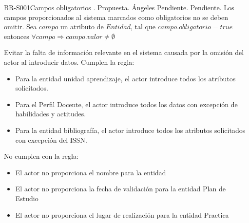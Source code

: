 \begin{BusinessRule}{BR-S001}{Campos obligatorios}
	{\bcIntegridad}    %
	{\btEnabler}     %
	{\blControlling}    %
	.
	\BRItem[Estado] Propuesta.
	 Ángeles
	 Pendiente.
	 Pendiente.
	\BRItem[Descripción] Los campos proporcionados al sistema marcados como obligatorios no se deben omitir.
	\BRItem[Sentencia] Sea $campo$ un atributo de $Entidad$, tal que $campo.obligatorio = true$ entonces
	$ \forall campo \Rightarrow campo.valor \neq \emptyset $
	
	\BRItem[Motivación] Evitar la falta de información relevante en el sistema causada por la omisión del actor al introducir datos.
	 Cumplen la regla:
	\begin{itemize}
		\item Para la entidad unidad aprendizaje, el actor introduce todos los atributos solicitados.
		\item Para el Perfil Docente, el actor introduce todos los datos con excepción de habilidades y actitudes.
		\item Para la entidad bibliografía, el actor introduce todos los atributos solicitados con excepción del ISSN.
	\end{itemize}
	 No cumplen con la regla:
	\begin{itemize}
		\item El actor no proporciona el nombre para la entidad
		\item El actor no proporciona la fecha de validación para la entidad Plan de Estudio
		\item El actor no proporciona el lugar de realización para la entidad Practica
	\end{itemize}
\end{BusinessRule}


